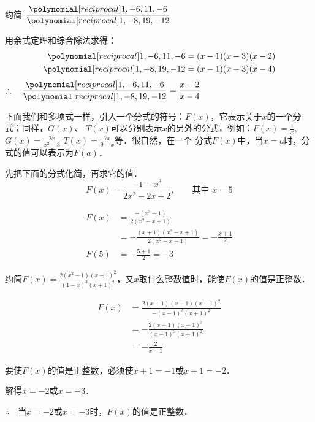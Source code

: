\begin{example}
    约简 $\frac{\poly{1,-6,11,-6}}{\poly{1,-8,19,-12}}$  
\end{example}

\begin{solution}
用余式定理和综合除法求得：
\[\begin{split}
    \poly{1,-6,11,-6}&=(x-1)(x-3)(x-2)\\
    \poly{1,-8,19,-12}&=(x-1)(x-3)(x-4)
\end{split}\]
$\therefore\quad \frac{\poly{1,-6,11,-6}}{\poly{1,-8,19,-12}}=\frac{x-2}{x-4}$
\end{solution}

下面我们和多项式一样，引入一个分式的符号：$F(x)$，它表示关于$x$的一个分式；同样，$G(x)$、
$T(x)$可以分别表示$x$的另外的分式，例如：$F(x)=\frac{1}{x}$, $G(x)=\frac{2x}{x^2-3}$
$T (x) =\frac{7x}{9-x}$等．很自然，在一个
分式$F(x)$中，当$x=a$时，分式的值可以表示为$F (a)$．

\begin{example}
    先把下面的分式化简，再求它的值．
    \[F(x)=\frac{-1-x^3}{2x^2-2x+2},\qquad \text{其中 } x=5 \]
\end{example}
\begin{solution}
    \[\begin{split}
        F(x)&=\frac{-(x^3+1)}{2(x^2-x+1)}\\
&=-\frac{(x+1)(x^2-x+1)}{2(x^2-x+1)}=-\frac{x+1}{2}\\        
F(5)&=-\frac{5+1}{2}=-3
    \end{split}\]
\end{solution}

\begin{example}
    约简$F(x)=\frac{2(x^2-1)(x-1)^2}{(1-x)^3(x+1)^2}$，又$x$取什么整数值时，能使$F(x)$的值是正整数．
\end{example}

\begin{solution}
    \[\begin{split}
        F(x)&=\frac{2(x+1)(x-1)(x-1)^2}{-(x-1)^3 (x+1)^2}\\
        &=-\frac{2(x+1)(x-1)^3}{(x-1)^3(x+1)^2}\\
        &=-\frac{2}{x+1}
    \end{split}\]

    要使$F(x)$的值是正整数，必须使$x+1=-1$或$x+1=-2$．

    解得$x=-2$或$x=-3$．

    $\therefore\quad $当$x=-2$或$x=-3$时，$F(x)$的值是正整数．
\end{solution}

